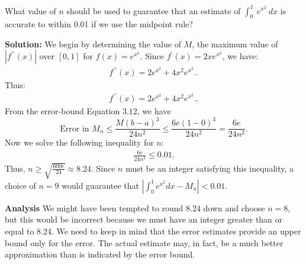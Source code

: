 \documentclass{report}
\begin{document}
        \pagebreak \bigbreak \noindent 
        \begin{eg}
            What value of  $n$ should be used to guarantee that an estimate of  $\int_{0}^{1}\ e^{x^{2}}\ dx $ is accurate to within 0.01 if we use the midpoint rule?
        \end{eg}
        \bigbreak \noindent 
        \textbf{Solution:}
        We begin by determining the value of $M$,  the maximum value of $|f^{\prime\prime}(x)|$ over $[0,1]$  for $f(x) = e^{x^2}$.  Since $f^{\prime}(x) = 2x e^{x^2}$,  we have:
        \begin{align*}
            f^{\prime\prime}(x) = 2e^{x^2} + 4x^2 e^{x^2}.
        .\end{align*}
        Thus:
        \begin{align*}
            f^{\prime\prime}(x) = 2e^{x^2} + 4x^2 e^{x^2}.
        .\end{align*}
        From the error-bound Equation \(3.12\), we have
        \[
            \text{Error in } M_n \leq \frac{M(b-a)^3}{24n^2} \leq \frac{6e(1-0)^3}{24n^2} = \frac{6e}{24n^2}.
        \]
        \bigbreak \noindent 
        Now we solve the following inequality for  $n$:
        \begin{align*}
            \frac{6e}{24n^{2}} \leq 0.01
        .\end{align*}
        Thus, \( n \geq \sqrt{\frac{600e}{24}} \approx 8.24 \). Since \( n \) must be an integer satisfying this inequality, a choice of \( n=9 \) would guarantee that \( \left| \int_0^1 e^{x^2} dx - M_n \right| < 0.01 \).

        \bigbreak \noindent 
        \textbf{Analysis}
        \bigbreak \noindent 
        We might have been tempted to round 8.24 down and choose $n=8 $, but this would be incorrect because we must have an integer greater than or equal to 8.24. We need to keep in mind that the error estimates provide an upper bound only for the error. The actual estimate may, in fact, be a much better approximation than is indicated by the error bound.


        
        


        
\end{document}
